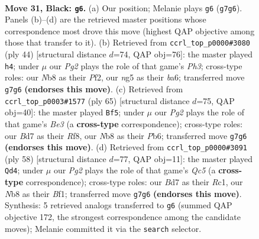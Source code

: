 \documentclass[11pt]{article}
\begin{document}
\clearpage

\begin{figure}[p]\centering
\begin{subfigure}{0.46\textwidth}\centering
\resizebox{\linewidth}{!}{%
\newchessgame
\chessboard[
  setfen={1n2r1k1/3b1ppp/2q5/4PpN1/p4P2/8/PQP2KPP/5B1R b - - 5 31},
  showmover=false,
  pgfstyle=straightmove, color=movearrow, markmove={g7-g6}
]}
\caption{}
\end{subfigure}\hfill
\begin{subfigure}{0.46\textwidth}\centering
\resizebox{\linewidth}{!}{%
\newchessgame
\chessboard[
  setfen={4r1k1/p1q2p2/bp2p1pp/8/2P1Q3/1P4PP/P4PB1/3R2K1 w - - 0 23},
  showmover=false,
  pgfstyle=straightmove, color=movearrow, markmove={h3-h4}
]}
\caption{}
\end{subfigure}
\\[4pt]
\begin{subfigure}{0.46\textwidth}\centering
\resizebox{\linewidth}{!}{%
\newchessgame
\chessboard[
  setfen={5r1k/6pp/1pB1bq2/2b1N3/Pp2Q3/7P/1P3PP1/5RK1 b - - 6 33},
  showmover=false,
  pgfstyle=straightmove, color=movearrow, markmove={e6-f5}
]}
\caption{}
\end{subfigure}\hfill
\begin{subfigure}{0.46\textwidth}\centering
\resizebox{\linewidth}{!}{%
\newchessgame
\chessboard[
  setfen={6k1/1b1r1p1p/2p3p1/1pQnP3/5P1q/1P4NP/6PK/2R2B2 w - - 1 30},
  showmover=false,
  pgfstyle=straightmove, color=movearrow, markmove={c5-d4}
]}
\caption{}
\end{subfigure}
\caption{\textbf{Move 31, Black: \texttt{g6}.} (a) Our position; Melanie plays \texttt{g6} (\texttt{g7g6}). Panels (b)--(d) are the retrieved master positions whose correspondence most drove this move (highest QAP objective among those that transfer to it). (b) Retrieved from \texttt{ccrl\_top\_p0000\#3080} (ply 44) [structural distance $d$=74, QAP obj=76]: the master played \texttt{h4}; under $\mu$ our \emph{Pg2} plays the role of that game's \emph{Ph3}; cross-type roles: our \emph{N}b8 as their \emph{P}f2, our \emph{n}g5 as their \emph{b}a6; transferred move \texttt{g7g6} \textbf{(endorses this move)}. (c) Retrieved from \texttt{ccrl\_top\_p0003\#1577} (ply 65) [structural distance $d$=75, QAP obj=40]: the master played \texttt{Bf5}; under $\mu$ our \emph{Pg2} plays the role of that game's \emph{Be3} (a \textbf{cross-type} correspondence); cross-type roles: our \emph{B}d7 as their \emph{R}f8, our \emph{N}b8 as their \emph{P}b6; transferred move \texttt{g7g6} \textbf{(endorses this move)}. (d) Retrieved from \texttt{ccrl\_top\_p0000\#3091} (ply 58) [structural distance $d$=77, QAP obj=11]: the master played \texttt{Qd4}; under $\mu$ our \emph{Pg2} plays the role of that game's \emph{Qc5} (a \textbf{cross-type} correspondence); cross-type roles: our \emph{B}d7 as their \emph{R}c1, our \emph{N}b8 as their \emph{B}f1; transferred move \texttt{g7g6} \textbf{(endorses this move)}. Synthesis: 5 retrieved analogs transferred to \texttt{g6} (summed QAP objective 172, the strongest correspondence among the candidate moves); Melanie committed it via the \texttt{search} selector.}
\label{fig:thought-m61}
\end{figure}
\end{document}
